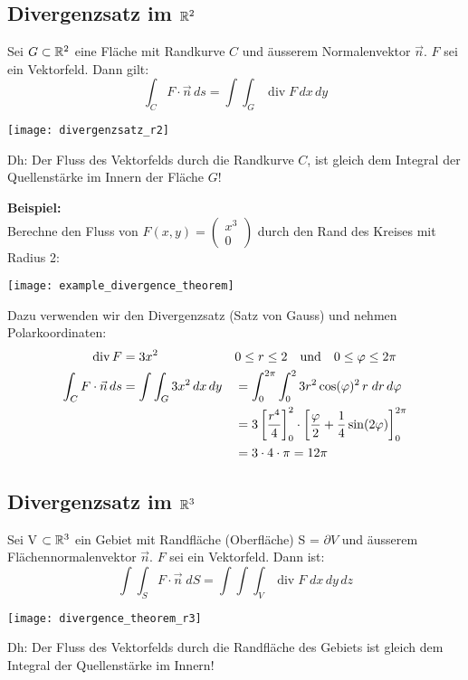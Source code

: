 \subsection{Divergenzsatz im $\mathbb{R}^2$}
\begin{minipage}{0.68\columnwidth}
	Sei $G \subset \mathbb{R}^2$ eine Fläche mit Randkurve $C$ und äusserem Normalenvektor $\vec{n}$. $F$ sei ein Vektorfeld. Dann gilt:
	\[
		\int_{C} F \cdot \vec{n} \, ds = \int\int_G \operatorname{div} F \, dx \, dy
	\]
\end{minipage}
\begin{minipage}{0.31\columnwidth}
	\texttt{[image: divergenzsatz\_r2]}
\end{minipage}
Dh: Der Fluss des Vektorfelds durch die Randkurve $C$, ist gleich dem Integral der Quellenstärke im Innern der Fläche $G$!\\

\begin{minipage}{0.75\columnwidth}
	\textbf{Beispiel:}\\
	Berechne den Fluss von 
	$F(x, y) = 
	\left(
	\begin{array}{c}
		x^3\\
		0 
	\end{array}\right)$
	durch den Rand des Kreises mit Radius 2:
\end{minipage}
\begin{minipage}{0.24\columnwidth}
	\texttt{[image: example\_divergence\_theorem]}
\end{minipage}
Dazu verwenden wir den Divergenzsatz (Satz von Gauss) und nehmen Polarkoordinaten:
\begin{align*}
	\operatorname{div} F &= 3x^2 && 0 \leq r \leq 2 \hspace{10pt} \text{und} \hspace{10pt} 0 \leq \varphi \leq 2\pi \\
	\int_{C} F \cdot \vec{n} \, ds &= 
	\int\int_G 3x^2 \, dx \, dy &&= 
	\int_0^{2\pi} \int_0^2 3 r^2 \cos(\varphi)^2 \, r \; dr \, d\varphi \\
	& &&= 3 \left[ \frac{r^4}{4} \right]_0^2 \cdot \left[ \frac{\varphi}{2} + \frac{1}{4} \sin(2\varphi) \right]_0^{2\pi} \\
	& &&= 3 \cdot 4 \cdot \pi = 12 \pi
\end{align*}
 
\subsection{Divergenzsatz im $\mathbb{R}^3$}
\begin{minipage}{0.68\columnwidth}
	Sei V $\subset \mathbb{R}^3$ ein Gebiet mit Randfläche (Oberfläche) S = $\partial V$ und äusserem Flächennormalenvektor $\vec{n}$. $F$ sei ein Vektorfeld. Dann ist:
	\[
		\int \int_S F \cdot \vec{n} \; dS = \int \int \int_V \operatorname{div} F \; dx \, dy \, dz
	\]	
\end{minipage}
\begin{minipage}{0.31\columnwidth}
	\texttt{[image: divergence\_theorem\_r3]}
\end{minipage}
Dh: Der Fluss des Vektorfelds durch die Randfläche des Gebiets ist gleich dem Integral der Quellenstärke im Innern!

